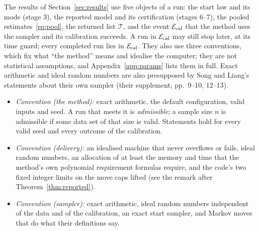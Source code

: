 The results of Section~\ref{sec:results} use five objects of a run: the start law and its mode (stage 3), the reported
model and its certification (stages 6--7), the pooled estimates~\eqref{eq:pool}, the returned list $\mathcal T$, and the
event $\mathcal E_{\mathrm{cal}}$ that the method uses the sampler and its calibration succeeds. A run in $\mathcal E_{\mathrm{cal}}$ may still stop later, at
its time guard; every completed run lies in $\mathcal E_{\mathrm{cal}}$. They also
use three conventions, which fix what ``the method'' means and idealise the computer; they are not statistical
assumptions, and Appendix~\ref{app:params} lists them in full. Exact arithmetic and ideal random numbers are also
presupposed by Song and Liang's statements about their own sampler (their supplement, pp.~9--10, 12--13).
\begin{itemize}[leftmargin=1.5em,itemsep=1pt]
  \item {}\label{asm:C1}\emph{Convention  (the method):} exact arithmetic, the default configuration,
    valid inputs and seed. A run that meets it is \emph{admissible}; a sample size $n$ is admissible if some data set of
    that size is valid. Statements hold for every valid seed and every outcome of the calibration.
  \item {}\label{asm:C2p}\emph{Convention  (delivery):} an idealised
    machine that never overflows or fails, ideal random numbers, an allocation of at least the memory and time that the method's own polynomial
    requirement formulas require, and the code's two fixed integer limits on the move caps lifted (see the remark after
    Theorem~\ref{thm:reported}).
  \item {}\label{asm:C3}\emph{Convention  (sampler):} exact arithmetic, ideal random numbers
    independent of the data and of the calibration, an exact start sampler, and Markov moves that do what their definitions
    say.
\end{itemize}
